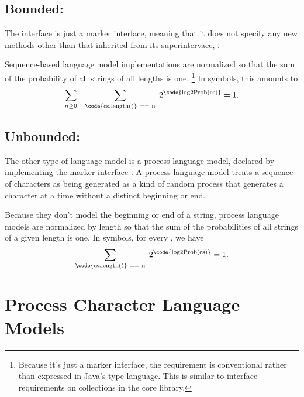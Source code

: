 \subsection{Bounded: }

The interface  is just a marker
interface, meaning that it does not specify any new methods other than
that inherited from its superintervace, .

Sequence-based language model implementations are normalized so
that the sum of the probability of all strings of all lengths is one.%
%
\footnote{Because it's just a marker interface, the requirement is
  conventional rather than expressed in Java's type language.  This is
  similar to interface requirements on collections in the
   core library.}
%
In symbols, this amounts to
%
\begin{equation}
\sum_{n \geq 0} \hspace*{8pt} \sum_{\text{\code{cs.length()} == n}} \hspace*{3pt} 2^{\text{\code{log2Prob(cs)}}} = 1.
\end{equation}

\subsection{Unbounded: }

The other type of language model is a process language model, declared
by implementing the marker interface .  A
process language model treats a sequence of characters as being
generated as a kind of random process that generates a character at a
time without a distinct beginning or end.  

Because they don't model the beginning or end of a string, process
language models are normalized by length so that the sum of the
probabilities of all strings of a given length is one.  In symbols,
for every , we have
%
\begin{equation}
\sum_{\text{\code{cs.length()} == n}} \hspace*{3pt} 2^{\text{\code{log2Prob(cs)}}} = 1.
\end{equation}
%


\section{Process Character Language Models}

